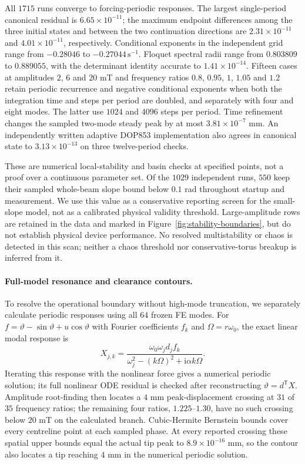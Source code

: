 All $1715$ runs converge to forcing-periodic responses. The largest
single-period canonical residual is $6.65\times10^{-11}$; the maximum
endpoint differences among the three initial states and between the two
continuation directions are $2.31\times10^{-11}$ and
$4.01\times10^{-11}$, respectively. Conditional exponents in the
independent grid range from $-0.28046$ to $-0.27044\,\mathrm{s}^{-1}$.
Floquet spectral radii range from $0.803809$ to $0.889055$, with the
determinant identity accurate to $1.41\times10^{-14}$.
Fifteen cases at amplitudes $2$, $6$ and $20$ mT and frequency ratios
$0.8$, $0.95$, $1$, $1.05$ and $1.2$ retain periodic recurrence and
negative conditional exponents when both the integration time and
steps per period are doubled, and separately with four and eight modes.
The latter use $1024$ and $4096$ steps per period. Time refinement
changes the sampled two-mode steady peak by at most
$3.81\times10^{-7}$ mm. An independently written adaptive DOP853
implementation also agrees in canonical state to $3.13\times10^{-13}$
on three twelve-period checks.

These are numerical local-stability and basin checks at specified points,
not a proof over a continuous parameter set. Of the $1029$ independent
runs, $550$ keep their sampled whole-beam slope bound below $0.1$ rad
throughout startup and measurement. We use this value as a conservative
reporting screen for the small-slope model, not as a calibrated physical
validity threshold. Large-amplitude rows are retained in the data and
marked in Figure~\ref{fig:stability-boundaries}, but do not establish
physical device performance. No resolved multistability or chaos is
detected in this scan; neither a chaos threshold nor conservative-torus
breakup is inferred from it.

\paragraph{Full-model resonance and clearance contours.}
To resolve the operational boundary without high-mode truncation, we
separately calculate periodic responses using all $64$ frozen FE modes.
For $f=\vartheta-\sin\vartheta+u\cos\vartheta$ with Fourier coefficients
$f_k$ and $\Omega=r\omega_0$, the exact linear modal response is
\begin{equation}
 X_{j,k}=\frac{\omega_0\omega_jd_j f_k}
 {\omega_j^2-(k\Omega)^2+\mathrm i\alpha k\Omega}.
\label{eq:boundary-fourier-response}
\end{equation}
Iterating this response with the nonlinear force gives a numerical
periodic solution; its full nonlinear ODE residual is checked after
reconstructing $\vartheta=d^{\mathsf T}X$. Amplitude root-finding then
locates a $4$ mm peak-displacement crossing at $31$ of $35$ frequency
ratios; the remaining four ratios, $1.225$--$1.30$, have no such crossing
below $20$ mT on the calculated branch. Cubic-Hermite Bernstein bounds
cover every centreline point at each sampled phase. At every reported
crossing these spatial upper bounds equal the actual tip peak to
$8.9\times10^{-16}$ mm, so the contour also locates a tip reaching
$4$ mm in the numerical periodic solution.

